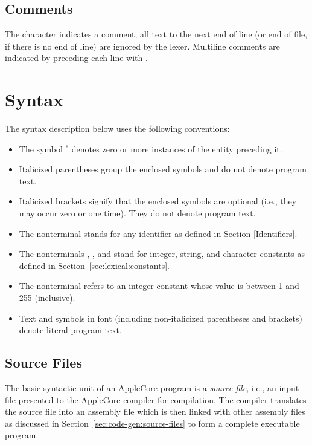 \documentclass[10pt]{article}
\begin{document}
\subsection{Comments}
\label{sec:lexical:comments}

The character \kwd{\#} indicates a comment; all text to the next end
of line (or end of file, if there is no end of line) are ignored by
the lexer.  Multiline comments are indicated by preceding each line
with \kwd{\#}.

\section{Syntax}
\label{sec:syntax}

The syntax description below uses the following conventions:
%
\begin{itemize}
%
\item The symbol $^*$ denotes zero or more instances of the entity
  preceding it.
%
\item Italicized parentheses \group{} group the enclosed symbols and
  do not denote program text.
%
\item Italicized brackets \opt{} signify that the enclosed symbols are
  optional (i.e., they may occur zero or one time).  They do not
  denote program text.
%
\item The nonterminal  stands for any identifier
  as defined in Section \ref{Identifiers}.
%
\item The nonterminals ,
  , and  stand for integer,
  string, and character constants as defined in
  Section~\ref{sec:lexical:constants}.
%
\item The nonterminal  refers to an integer constant
  whose value is between 1 and 255 (inclusive).
%
\item Text and symbols in  font (including
  non-italicized parentheses and brackets) denote literal program
  text.
%
\end{itemize}

\subsection{Source Files}
\label{sec:syntax:source-files}

The basic syntactic unit of an AppleCore program is a \emph{source
  file}, i.e., an input file presented to the AppleCore compiler for
compilation.  The compiler translates the source file into an assembly
file which is then linked with other assembly files as discussed in
Section~\ref{sec:code-gen:source-files} to form a complete executable
program.
\end{document}
